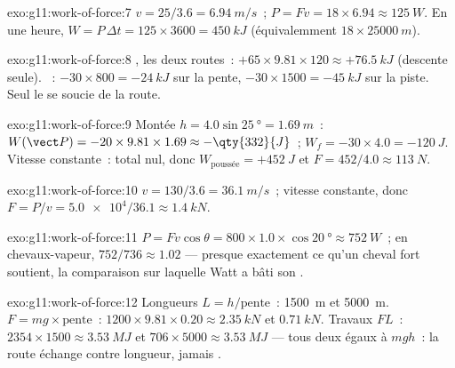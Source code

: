 \begin{solution}{exo:g11:work-of-force:7}
$v = 25/3.6 = \qty{6.94}{m/s}$~; $P = Fv = 18 \times 6.94 \approx
\qty{125}{W}$. En une heure, $W = P\,\Delta t = 125 \times 3600 =
\qty{450}{kJ}$ (équivalemment $18 \times \qty{25000}{m}$).
\end{solution}

\begin{solution}{exo:g11:work-of-force:8}
, les deux routes~:
$+65 \times 9.81 \times 120 \approx +\qty{76.5}{kJ}$ (descente seule).
~: $-30 \times 800 =
-\qty{24}{kJ}$ sur la pente, $-30 \times 1500 = -\qty{45}{kJ}$ sur la
piste. Seul le  se soucie de la
route.
\end{solution}

\begin{solution}{exo:g11:work-of-force:9}
Montée $h = 4.0\sin\qty{25}{\degree} = \qty{1.69}{m}$~:
$W(\vect P) = -20 \times 9.81 \times 1.69 \approx -\qty{332}{J}$~;
$W_f = -30 \times 4.0 = -\qty{120}{J}$. Vitesse constante~: 
total nul, donc $W_{\text{poussée}} = +\qty{452}{J}$ et
$F = 452/4.0 \approx \qty{113}{N}$.
\end{solution}

\begin{solution}{exo:g11:work-of-force:10}
$v = 130/3.6 = \qty{36.1}{m/s}$~; vitesse constante, donc
$F = P/v = \num{5.0e4}/36.1 \approx \qty{1.4}{kN}$.
\end{solution}

\begin{solution}{exo:g11:work-of-force:11}
$P = Fv\cos\theta = 800 \times 1.0 \times \cos\qty{20}{\degree}
\approx \qty{752}{W}$~; en
chevaux-vapeur, $752/736 \approx \num{1.02}$ ---
presque exactement ce qu'un cheval fort soutient, la comparaison sur
laquelle Watt a bâti son .
\end{solution}

\begin{solution}{exo:g11:work-of-force:12}
Longueurs $L = h/\text{pente}$~: \qty{1500}{m} et \qty{5000}{m}.
 $F = mg \times \text{pente}$~:
$1200 \times 9.81 \times 0.20 \approx \qty{2.35}{kN}$ et
$\qty{0.71}{kN}$. Travaux $FL$~:
$2354 \times 1500 \approx \qty{3.53}{MJ}$ et
$706 \times 5000 \approx \qty{3.53}{MJ}$ --- tous deux égaux à $mgh$~:
la route échange  contre longueur,
jamais .
\end{solution}

